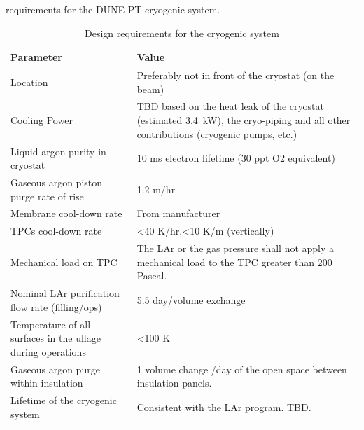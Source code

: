 requirements for the DUNE-PT cryogenic system.
%
\begin{table}[htbp]
\centering
\begin{tabular}{|p{}|p{}|}
\hline
 \textbf{ Parameter} & \textbf{Value} \\ \hline
 Location & Preferably not in front of the cryostat (on the beam) \\ \hline
 Cooling Power & TBD based on the heat leak of the cryostat (estimated 3.4~kW), the cryo-piping and all other contributions (cryogenic pumps, etc.) \\ \hline
 Liquid argon purity in cryostat & 10 ms electron lifetime (30 ppt O2 equivalent) \\  \hline
 Gaseous argon piston purge rate of rise & 1.2 m/hr \\ \hline
 Membrane cool-down rate & From manufacturer \\  \hline
 TPCs cool-down rate & \textless40 K/hr,\textless10 K/m (vertically)
 \\ \hline
Mechanical load on TPC & The LAr or the gas pressure shall not apply a mechanical load to the TPC greater than 200 Pascal. \\ \hline
Nominal LAr purification flow rate (filling/ops) & 5.5 day/volume exchange \\ \hline
 Temperature of all surfaces in the ullage during operations & \textless100 K \\  \hline
 Gaseous argon purge within insulation & 1 volume change /day of the open space between insulation panels. \\ \hline
 Lifetime of the cryogenic system & Consistent with the LAr program. TBD. \\ \hline
\end{tabular}
\caption{Design requirements for the cryogenic system}
\label{tbl:cryo-design-parameters}
\end{table}
%


